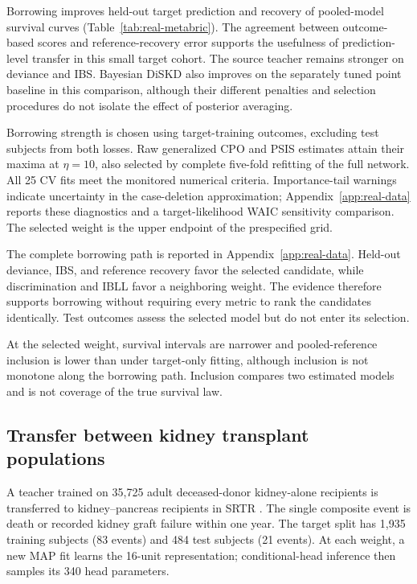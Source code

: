\documentclass{article} %
\begin{document}
Borrowing improves held-out target prediction and recovery of pooled-model survival curves (Table~\ref{tab:real-metabric}). The agreement between outcome-based scores and reference-recovery error supports the usefulness of prediction-level transfer in this small target cohort. The source teacher remains stronger on deviance and IBS. Bayesian DiSKD also improves on the separately tuned point baseline in this comparison, although their different penalties and selection procedures do not isolate the effect of posterior averaging.

Borrowing strength is chosen using target-training outcomes, excluding test subjects from both losses. Raw generalized CPO and PSIS estimates attain their maxima at $\eta=10$, also selected by complete five-fold refitting of the full network. All 25 CV fits meet the monitored numerical criteria. Importance-tail warnings indicate uncertainty in the case-deletion approximation; Appendix~\ref{app:real-data} reports these diagnostics and a target-likelihood WAIC sensitivity comparison. The selected weight is the upper endpoint of the prespecified grid.

The complete borrowing path is reported in Appendix~\ref{app:real-data}. Held-out deviance, IBS, and reference recovery favor the selected candidate, while discrimination and IBLL favor a neighboring weight. The evidence therefore supports borrowing without requiring every metric to rank the candidates identically. Test outcomes assess the selected model but do not enter its selection.



At the selected weight, survival intervals are narrower and pooled-reference inclusion is lower than under target-only fitting, although inclusion is not monotone along the borrowing path. Inclusion compares two estimated models and is not coverage of the true survival law.

\subsection{Transfer between kidney transplant populations}
\label{sec:real-kidney}
A teacher trained on 35,725 adult deceased-donor kidney-alone recipients is transferred to kidney--pancreas recipients in SRTR \citep{srtrSAF}. The single composite event is death or recorded kidney graft failure within one year. The target split has 1,935 training subjects (83 events) and 484 test subjects (21 events). At each weight, a new MAP fit learns the 16-unit representation; conditional-head inference then samples its 340 head parameters.
\end{document}

